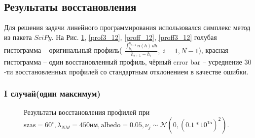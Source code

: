 \documentclass[a4paper,14pt]{article}
\theoremstyle{plain}
\theoremstyle{definition}
\theoremstyle{remark}
\begin{document}
\subsection{Результаты восстановления}
Для решения задачи линейного программирования
использовался симплекс метод из пакета $SciPy$.
На Рис. \ref{prof_12}, \ref{prof3_12},
\ref{proff_12}, \ref{proff3_12} голубая гистограмма --
оригинальный профиль(
$\frac{\int_{h_{i}}^{h_{i+1}} n(h) \, dh}{
h_{i+1} - h_i} , \; i=\overline{1, N-1}$), 
красная гистограмма -- один восстановленный профиль,
чёрный error bar -- усреднение $30$-ти восстановленных профилей
со стандартным отклонением в качестве ошибки.
\clearpage
\subsubsection{I случай(один максимум)}
\begin{figure}[bh]
\noindent{}
\caption{Результаты восстановления профилей при
$\text{szas}=60^{\circ}, \lambda_{NM}= 450\text{нм},
\text{albedo}=0.05, \nu_j \sim 
\mathcal{N}(0, (0.1 * 10^{15})^2)$.}
\label{prof_12}
\end{figure}
\newpage
\end{document}
